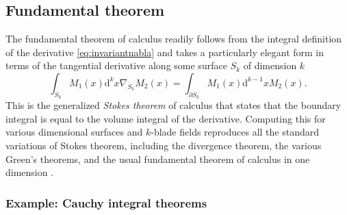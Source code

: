 \documentclass[1p,sort&compress]{elsarticle}
\numberwithin{equation}{section}
\begin{document}

\subsection{Fundamental theorem}


The fundamental theorem of calculus readily follows from the integral definition of the derivative \eqref{eq:invariantnabla} and takes a particularly elegant form in terms of the tangential derivative along some surface $S_k$ of dimension $k$ \cite{Hestenes1968}
\begin{equation}\label{eq:fundamentaltheorem}
  \int_{S_k}\!\! M_1(x) \textrm{d}^k\!x \nabla_{S_k} M_2(x) = \int_{\partial S_k}\!\! M_1(x) \textrm{d}^{k-1}\!x M_2(x).
\end{equation}
This is the generalized \emph{Stokes theorem} of calculus that states that the boundary integral is equal to the volume integral of the derivative.  Computing this for various dimensional surfaces and $k$-blade fields reproduces all the standard variations of Stokes theorem, including the divergence theorem, the various Green's theorems, and the usual fundamental theorem of calculus in one dimension \cite{Hestenes1968b}.  
 

\subsubsection{Example: Cauchy integral theorems}

\end{document}
